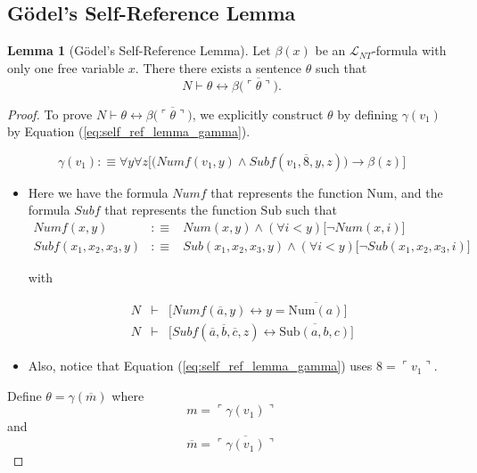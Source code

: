 \documentclass[11pt,letterpaper]{book}
\theoremstyle{definition}
\newtheorem{lemma}{Lemma}[section]
\begin{document}
\subsection{G\"odel's Self-Reference Lemma}


\begin{lemma}[G\"odel's Self-Reference Lemma]
Let $\beta (x)$ be an $\mathcal{L}_{NT}$-formula with only one free variable $x$. There there exists a sentence $\theta$ such that
$$ N \vdash \theta \leftrightarrow \beta \big( \overline{\ulcorner \theta \urcorner} \big). $$
\label{lemma:self_reference_lemma}
\end{lemma}

\begin{proof}
To prove $N \vdash \theta \leftrightarrow \beta \big( \overline{\ulcorner \theta \urcorner} \big)$, we explicitly construct $\theta$ by defining $\gamma (v_1)$ by Equation (\ref{eq:self_ref_lemma_gamma}).

\begin{equation}
\gamma (v_1) : \equiv \forall y \forall z \bigg[ \big( Numf(v_1, y) \land Subf(v_1 , \overline{8}, y, z ) \big) \rightarrow \beta(z) \bigg] \label{eq:self_ref_lemma_gamma}
\end{equation}
\begin{itemize}
\item{Here we have the formula $Numf$ that represents the function $\text{Num}$, and the formula $Subf$ that represents the function $\text{Sub}$ such that
\begin{eqnarray*}
Numf(x, y) &:\equiv & Num(x, y) \land (\forall i < y) \big[ \lnot Num(x, i) \big] \\
Subf(x_1, x_2, x_3, y) &:\equiv & Sub(x_1, x_2, x_3, y) \land (\forall i < y) \big[ \lnot Sub(x_1, x_2, x_3, i) \big] 
\end{eqnarray*}

with

\begin{eqnarray*}
N & \vdash & \bigg[ Numf(\overline{a}, y) \leftrightarrow y = \overline{\text{Num} (a)} \bigg] \\
N & \vdash & \bigg[ Subf(\overline{a}, \overline{b}, \overline{c}, z ) \leftrightarrow \overline{\text{Sub} (a, b, c) } \bigg]
\end{eqnarray*}
}
\item{Also, notice that Equation (\ref{eq:self_ref_lemma_gamma}) uses $8 = \ulcorner v_1 \urcorner$.}
\end{itemize}

Define $\theta = \gamma (\overline{m})$ where
$$ m = \ulcorner \gamma (v_1) \urcorner $$
and 
$$ \overline{m} = \overline{\ulcorner \gamma (v_1) \urcorner} $$


\end{proof}
\end{document}
